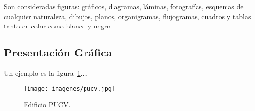      Son consideradas figuras: gráficos, diagramas, láminas, fotografías,
esquemas de cualquier naturaleza, dibujos, planos, organigramas, flujogramas,
cuadros y tablas tanto en color como blanco y negro...

\subsection{Presentación Gráfica}
       
Un ejemplo es la figura~\ref{fig:pucv}....


\begin{figure}[!htbp]
\begin{center}
\texttt{[image: imagenes/pucv.jpg]} 
\caption{Edificio PUCV.}\label{fig:pucv}
\end{center}
\end{figure}